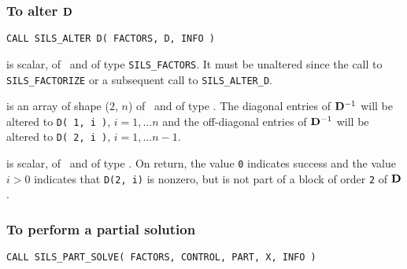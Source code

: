 \documentclass{galahad}
\newcommand{\packagename}{SILS}
\begin{document}
\subsubsection{To alter ${\mathbf{D}}$}
 
\hskip0.5in 
{\tt CALL \packagename\_ALTER D( FACTORS, D, INFO )}
 
\begin{description} 
 is scalar, of \intentinout\ and of type 
{\tt \packagename\_FACTORS}. It 
must be unaltered since the call to {\tt \packagename\_FACTOR\-IZE}  
or a subsequent call to {\tt \packagename\_ALTER\_D}. 
  
 is an array of shape ($2$, $n$) of \intentinout\, and of 
type \realdp. The diagonal entries of ${\mathbf{D}}^{-1} $ will 
be altered to {\tt D( 1, i )}, $i = 1, \ldots n$ and the off-diagonal 
entries of ${\mathbf{D}}^{-1} $ will be altered to {\tt D( 2, i )}, 
$i = 1, \ldots n-1$. 
 
 is scalar, of \intentout\, and of type \integer.  On return, 
the value {\tt 0} indicates success and the value $i > 0$ indicates that  
{\tt D(2, i)} is nonzero, but is not part of a block of order 
{\tt 2} of ${\mathbf{D}}$. 
 
\end{description} 

\subsubsection{To perform a partial solution}
 
\hskip0.5in 
{\tt CALL \packagename\_PART\_SOLVE( FACTORS, CONTROL, PART, X, INFO )}
 
\end{document}
